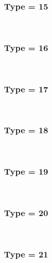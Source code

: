 \documentclass{article}
\begin{document}
            \subsubsection*{Type = 15}    
            
            \\
        
        
        
            \subsubsection*{Type = 16}    
            
            \\
        
        
        
            \subsubsection*{Type = 17}    
            
            \\
        
        
        
            \subsubsection*{Type = 18}    
            
            \\
        
        
        
            \subsubsection*{Type = 19}    
            
            \\
        
        
        
            \subsubsection*{Type = 20}    
            
            \\
        
        
        
            \subsubsection*{Type = 21}    
            
\end{document}
